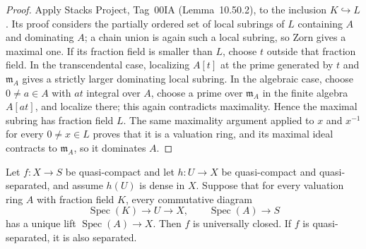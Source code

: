 \begin{proof}
  Apply Stacks Project, Tag~00IA (Lemma~10.50.2), to the inclusion
  $K\hookrightarrow L$.  Its proof considers the partially ordered set of
  local subrings of $L$ containing $A$ and dominating $A$; a chain union is
  again such a local subring, so Zorn gives a maximal one.  If its fraction
  field is smaller than $L$, choose $t$ outside that fraction field.  In the
  transcendental case, localizing $A[t]$ at the prime generated by $t$ and
  $\mathfrak m_A$ gives a strictly larger dominating local subring.  In the
  algebraic case, choose $0\ne a\in A$ with $at$ integral over $A$, choose a
  prime over $\mathfrak m_A$ in the finite algebra $A[at]$, and localize
  there; this again contradicts maximality.  Hence the maximal subring has
  fraction field $L$.  The same maximality argument applied to $x$ and
  $x^{-1}$ for every $0\ne x\in L$ proves that it is a valuation ring, and
  its maximal ideal contracts to $\mathfrak m_A$, so it dominates $A$.
\end{proof}

\begin{lemma}
  \label{lemma:nagata-dense-source-valuative}

  Let \(f\colon X\to S\) be quasi-compact and let
  \(h\colon U\to X\) be quasi-compact and quasi-separated,
  and assume \(h(U)\) is dense in \(X\).  Suppose that for every valuation
  ring \(A\) with fraction field \(K\), every commutative diagram
  \[
    \operatorname{Spec}(K)\longrightarrow U\longrightarrow X,
    \qquad
    \operatorname{Spec}(A)\longrightarrow S
  \]
  has a unique lift \(\operatorname{Spec}(A)\to X\).  Then \(f\) is
  universally closed.  If \(f\) is quasi-separated, it is also separated.
\end{lemma}

